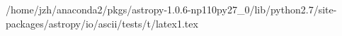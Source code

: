 /home/jzh/anaconda2/pkgs/astropy-1.0.6-np110py27_0/lib/python2.7/site-packages/astropy/io/ascii/tests/t/latex1.tex